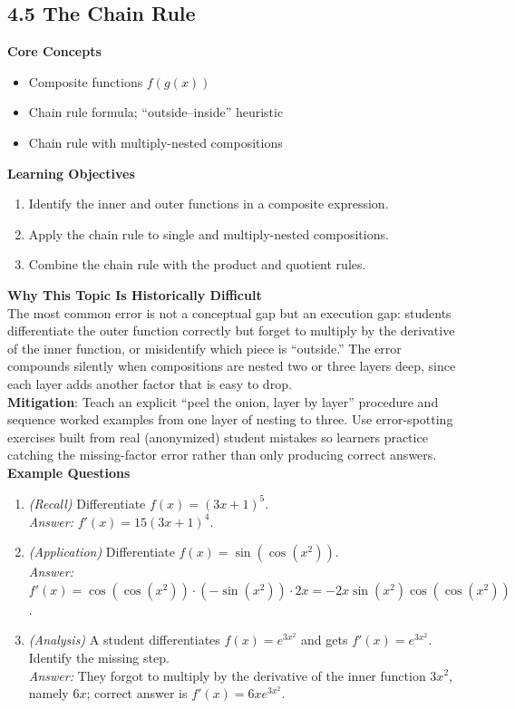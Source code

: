 \documentclass[11pt]{article}
\begin{document}
\subsection{4.5 The Chain Rule}
\textbf{Core Concepts}
\begin{itemize}
\item Composite functions $f(g(x))$
\item Chain rule formula; ``outside--inside'' heuristic
\item Chain rule with multiply-nested compositions
\end{itemize}
\textbf{Learning Objectives}
\begin{enumerate}
\item Identify the inner and outer functions in a composite expression.
\item Apply the chain rule to single and multiply-nested compositions.
\item Combine the chain rule with the product and quotient rules.
\end{enumerate}
\textbf{Why This Topic Is Historically Difficult} \\
The most common error is not a conceptual gap but an execution gap: students differentiate the outer function correctly but forget to multiply by the derivative of the inner function, or misidentify which piece is ``outside.'' The error compounds silently when compositions are nested two or three layers deep, since each layer adds another factor that is easy to drop. \\
\textbf{Mitigation}: Teach an explicit ``peel the onion, layer by layer'' procedure and sequence worked examples from one layer of nesting to three. Use error-spotting exercises built from real (anonymized) student mistakes so learners practice catching the missing-factor error rather than only producing correct answers.
\textbf{Example Questions}
\begin{enumerate}
\item \emph{(Recall)} Differentiate $f(x) = (3x+1)^5$. \\
\textit{Answer:} $f'(x) = 15(3x+1)^4$.
\item \emph{(Application)} Differentiate $f(x) = \sin(\cos(x^2))$. \\
\textit{Answer:} $f'(x) = \cos(\cos(x^2))\cdot(-\sin(x^2))\cdot 2x = -2x\sin(x^2)\cos(\cos(x^2))$.
\item \emph{(Analysis)} A student differentiates $f(x)=e^{3x^2}$ and gets $f'(x)=e^{3x^2}$. Identify the missing step. \\
\textit{Answer:} They forgot to multiply by the derivative of the inner function $3x^2$, namely $6x$; correct answer is $f'(x)=6xe^{3x^2}$.
\end{enumerate}
\end{document}
